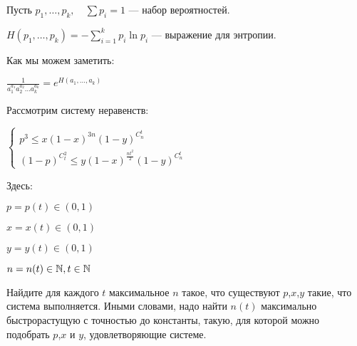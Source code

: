 \begin{rem}
Пусть $p_1 , \dots, p_k, \quad \sum p_i = 1$ --- набор вероятностей.

$H(p_1, \dots, p_k) = - \sum \limits _{i=1} ^k p_i \ln p_i$ --- выражение для энтропии.

Как мы можем заметить:

$ \frac 1 {a_1^ {a_1} a_2 ^ {a_2} \dots a_k^{a_k} }  = e ^ {H(a_1, \dots, a_k) }$
\end{rem}

\begin{task}
Рассмотрим систему неравенств:

$\begin{cases}
p^3 \leq x(1-x) ^{3n} (1-y)^{C^t_n} \\
(1-p)^{C^2_t} \leq y(1-x) ^{\frac  {nt^2 } 2 } (1-y)^{C^t_n}
\end{cases}
$

Здесь:

$p= p(t) \in (0,1) $

$x = x(t) \in (0,1)$

$y = y(t) \in (0,1)$

$n = n(t) \in \mathbb{N}, t\in \mathbb{N}$

Найдите для каждого $t$ максимальное $n$ такое, что существуют  $p$,$x$,$y$ такие, что система выполняется. Иными словами, надо найти $n(t)$ максимально быстрорастущую с точностью до константы, такую, для которой можно подобрать $p$,$ x$ и $y$, удовлетворяющие системе.
\end{task}

